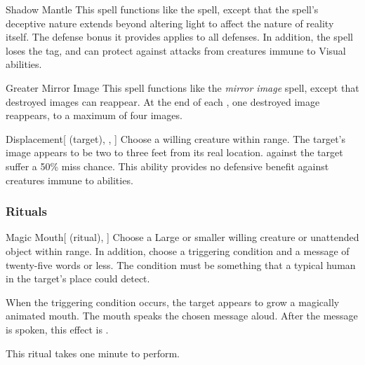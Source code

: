 \lowercase{\hypertarget{spell:Shadow Mantle}{}}\label{spell:Shadow Mantle}
\begin{ability}[\nth{3}]{\hypertarget{spell:Shadow Mantle}{Shadow Mantle}}
This spell functions like the  spell, except that the spell's deceptive nature extends beyond altering light to affect the nature of reality itself.
The defense bonus it provides applies to all defenses.
In addition, the spell loses the  tag, and can protect against attacks from creatures immune to Visual abilities.
\end{ability}
\vspace{0.25em}



\lowercase{\hypertarget{spell:Greater Mirror Image}{}}\label{spell:Greater Mirror Image}
\begin{ability}[\nth{4}]{\hypertarget{spell:Greater Mirror Image}{Greater Mirror Image}}
This spell functions like the \textit{mirror image} spell, except that destroyed images can reappear.
At the end of each , one destroyed image reappears, to a maximum of four images.
\end{ability}
\vspace{0.25em}



\lowercase{\hypertarget{spell:Displacement}{}}\label{spell:Displacement}
\begin{ability}[\nth{6}]{\hypertarget{spell:Displacement}{Displacement}}[ (target), , ]
Choose a willing creature within \rngmed range.
The target's image appears to be two to three feet from its real location.
  against the target suffer a 50\% miss chance.
This ability provides no defensive benefit against creatures immune to  abilities.
\end{ability}
\vspace{0.25em}



\subsubsection{Rituals}


\lowercase{\hypertarget{spell:Magic Mouth}{}}\label{spell:Magic Mouth}
\begin{ability}[\nth{1}]{\hypertarget{spell:Magic Mouth}{Magic Mouth}}[ (ritual), ]
Choose a Large or smaller willing creature or unattended object within \rngclose range.
In addition, choose a triggering condition and a message of twenty-five words or less.
The condition must be something that a typical human in the target's place could detect.

When the triggering condition occurs, the target appears to grow a magically animated mouth.
The mouth speaks the chosen message aloud.
After the message is spoken, this effect is .

This ritual takes one minute to perform.
\end{ability}
\vspace{0.25em}


